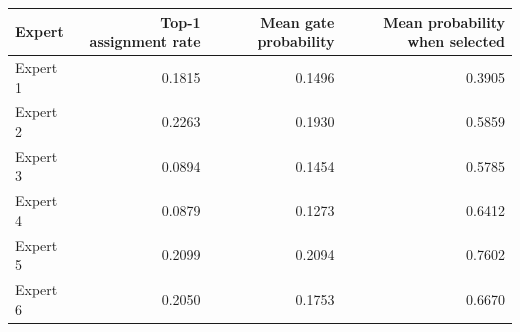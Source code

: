 \begin{tabular}{lrrr}
\toprule
Expert & Top-1 assignment rate & Mean gate probability & Mean probability when selected \\
\midrule
Expert 1 & 0.1815 & 0.1496 & 0.3905 \\
Expert 2 & 0.2263 & 0.1930 & 0.5859 \\
Expert 3 & 0.0894 & 0.1454 & 0.5785 \\
Expert 4 & 0.0879 & 0.1273 & 0.6412 \\
Expert 5 & 0.2099 & 0.2094 & 0.7602 \\
Expert 6 & 0.2050 & 0.1753 & 0.6670 \\
\bottomrule
\end{tabular}
